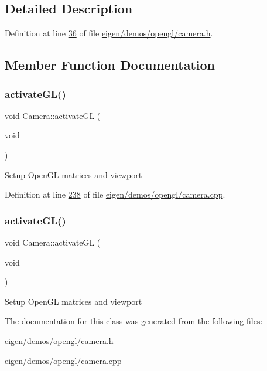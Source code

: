 \subsection{Detailed Description}


Definition at line \hyperlink{eigen_2demos_2opengl_2camera_8h_source_l00036}{36} of file \hyperlink{eigen_2demos_2opengl_2camera_8h_source}{eigen/demos/opengl/camera.\+h}.



\subsection{Member Function Documentation}
\mbox{\label{class_camera_a4872379b01876af2ffd8d2d871472ed1}} 
\subsubsection{\texorpdfstring{activate\+G\+L()}{activateGL()}\hspace{0.1cm}{\footnotesize\ttfamily [1/2]}}
{\footnotesize\ttfamily void Camera\+::activate\+GL (\begin{DoxyParamCaption}\item[{void}]{ }\end{DoxyParamCaption})}

Setup Open\+GL matrices and viewport 

Definition at line \hyperlink{eigen_2demos_2opengl_2camera_8cpp_source_l00238}{238} of file \hyperlink{eigen_2demos_2opengl_2camera_8cpp_source}{eigen/demos/opengl/camera.\+cpp}.

\mbox{\label{class_camera_a4872379b01876af2ffd8d2d871472ed1}} 
\subsubsection{\texorpdfstring{activate\+G\+L()}{activateGL()}\hspace{0.1cm}{\footnotesize\ttfamily [2/2]}}
{\footnotesize\ttfamily void Camera\+::activate\+GL (\begin{DoxyParamCaption}\item[{void}]{ }\end{DoxyParamCaption})}

Setup Open\+GL matrices and viewport 

The documentation for this class was generated from the following files\+:\begin{DoxyCompactItemize}
\item 
eigen/demos/opengl/camera.\+h\item 
eigen/demos/opengl/camera.\+cpp\end{DoxyCompactItemize}

